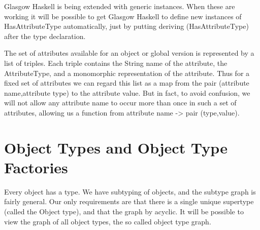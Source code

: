 \documentclass[a4paper]{article}
\begin{document}
Glasgow Haskell is being extended with generic instances.  When these
are working it will be possible to get Glasgow Haskell to define
new instances of HasAttributeType automatically, just by putting 
deriving (HasAttributeType) after the type declaration.

The set of attributes available for an object or global version
is represented by a list of triples.  Each triple contains the String
name of the attribute, the AttributeType, and a monomorphic representation
of the attribute.  Thus for a fixed set of attributes we can regard
this list as a map from the pair (attribute name,attribute type) to the
attribute value.  But in fact, to avoid confusion, we will not allow
any attribute name to occur more than once in such a set of attributes,
allowing us a function from attribute name -> pair (type,value).

\section{Object Types and Object Type Factories}
Every object has a type.  We have subtyping of objects, and the subtype
graph is fairly general.  Our only requirements are that there is
a single unique supertype (called the Object type), and that the graph 
by acyclic.  It will be possible to view the graph of all object types, the 
so called object type graph.
\end{document}

